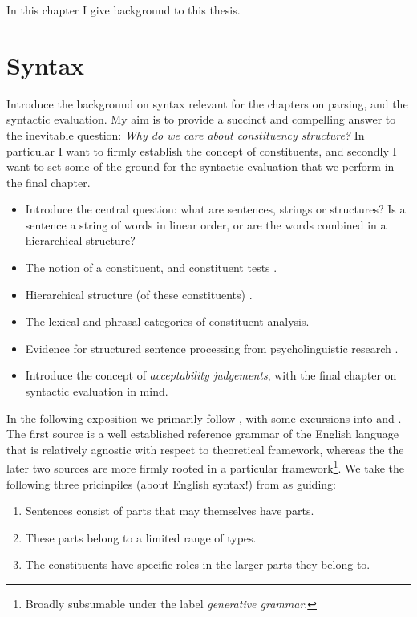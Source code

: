 % 

In this chapter I give background to this thesis.

\section{Syntax}
Introduce the background on syntax relevant for the chapters on parsing, and the syntactic evaluation. My aim is to provide a succinct and compelling answer to the inevitable question: \textit{Why do we care about constituency structure?} In particular I want to firmly establish the concept of constituents, and secondly I want to set some of the ground for the syntactic evaluation that we perform in the final chapter.
\begin{itemize}
  \item Introduce the central question: what are sentences, strings or structures? Is a sentence a string of words in linear order, or are the words combined in a hierarchical structure? \citep{everaert2015structures,frank2012hierarchical}
  \item The notion of a constituent, and constituent tests \citet{carnie2010constituent,huddleston2002grammar}.
  \item Hierarchical structure (of these constituents) \citet{everaert2015structures}.
  \item The lexical and phrasal categories of constituent analysis.
  \item Evidence for structured sentence processing from psycholinguistic research \citep{hale2001earley,levy2008expectation,brennan2016abstract}.
  \item Introduce the concept of \textit{acceptability judgements}, with the final chapter on syntactic evaluation in mind.
\end{itemize}

In the following exposition we primarily follow \citet{huddleston2002grammar}, with some excursions into \citet{carnie2010constituent} and \citet{everaert2015structures}. The first source is a well established reference grammar of the English language that is relatively agnostic with respect to theoretical framework, whereas the the later two sources are more firmly rooted in a particular framework\footnote{Broadly subsumable under the label \textit{generative grammar}.}. We take the following three pricinpiles (about English syntax!) from \citep{huddleston2002grammar} as guiding:
\begin{enumerate}[label=(\roman*)]
  \item Sentences consist of parts that may themselves have parts.
  \item These parts belong to a limited range of types.
  \item The constituents have specific roles in the larger parts they belong to.
\end{enumerate}

